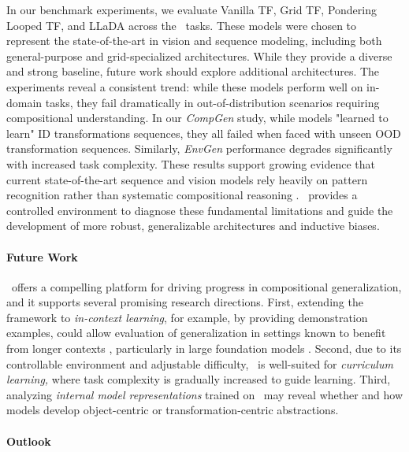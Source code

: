 In our benchmark experiments, we evaluate Vanilla TF, Grid TF, Pondering Looped TF, and LLaDA across the \generatorName\ tasks. These models were chosen to represent the state-of-the-art in vision and sequence modeling, including both general-purpose and grid-specialized architectures. While they provide a diverse and strong baseline, future work should explore additional architectures. The experiments reveal a consistent trend: while these models perform well on in-domain tasks, they fail dramatically in out-of-distribution scenarios requiring compositional understanding. In our \textit{CompGen} study, while models "learned to learn" ID transformations sequences, they all failed when faced with unseen OOD transformation sequences. Similarly, \textit{EnvGen} performance degrades significantly with increased task complexity. These results support growing evidence that current state-of-the-art sequence and vision models rely heavily on pattern recognition rather than systematic compositional reasoning \cite{geirhos2020shortcut}. \generatorName\ provides a controlled environment to diagnose these fundamental limitations and guide the development of more robust, generalizable architectures and inductive biases.

\paragraph{Future Work}

\generatorName\ offers a compelling platform for driving progress in compositional generalization, and it supports several promising research directions.
First, extending the framework to \emph{in-context learning}, for example, by providing demonstration examples, could allow evaluation of generalization in settings known to benefit from longer contexts \cite{cole_osman_deep_learning_for_arc}, particularly in large foundation models \cite{an2023context, zhang2025understanding, lampinen2025generalization}.
Second, due to its controllable environment and adjustable difficulty, \generatorName\ is well-suited for \emph{curriculum learning,} where task complexity is gradually increased to guide learning.
Third, analyzing \emph{internal model representations} trained on \generatorName\ may reveal whether and how models develop object-centric or transformation-centric abstractions.

\paragraph{Outlook}


